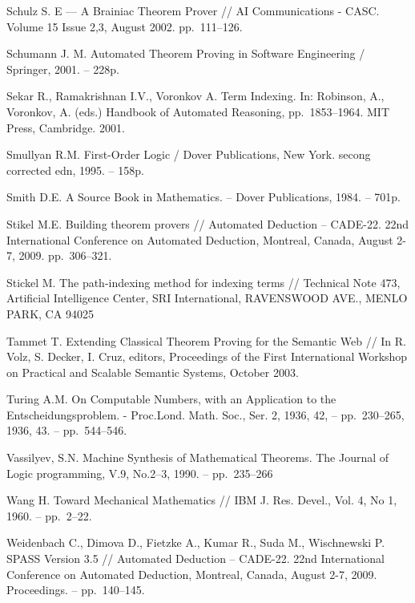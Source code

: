 \begin{thebibliography}{99}
 Schulz S. E --- A Brainiac Theorem Prover // AI Communications - CASC. Volume 15 Issue 2,3, August 2002. pp.~111--126.

 Schumann J. M. Automated Theorem Proving in Software Engineering / Springer, 2001. -- 228p.

 Sekar R., Ramakrishnan I.V., Voronkov A. Term Indexing. In: Robinson, A., Voronkov, A. (eds.) Handbook of Automated Reasoning, pp.~1853--1964. MIT Press, Cambridge. 2001.

 Smullyan R.M. First-Order Logic / Dover Publications, New York. secong corrected edn, 1995. -- 158p.

 Smith D.E. A Source Book in Mathematics. -- Dover Publications, 1984. -- 701p.


 Stikel M.E. Building theorem provers // Automated Deduction – CADE-22. 22nd International Conference on Automated Deduction, Montreal, Canada, August 2-7, 2009. pp.~306--321.

 Stickel M. The path-indexing method for indexing terms // Technical Note 473, Artificial Intelligence Center, SRI International, RAVENSWOOD AVE., MENLO PARK, CA 94025

 Tammet T. Extending Classical Theorem Proving for the Semantic Web // In R. Volz, S. Decker, I. Cruz, editors, Proceedings of the First International Workshop on Practical and Scalable Semantic Systems, October 2003.

 Turing A.M. On Computable Numbers, with an Application to the Entscheidungsproblem. - Proc.Lond. Math. Soc., Ser. 2, 1936, 42, -- pp.~230--265, 1936, 43. -- pp.~544--546.

 Vassilyev, S.N. Machine Synthesis of Mathematical Theorems. The Journal of Logic programming, V.9, No.2--3, 1990. -- pp.~235--266

 Wang H. Toward Mechanical Mathematics // IBM J. Res. Devel., Vol. 4, No 1, 1960. -- pp.~2--22.

 Weidenbach C., Dimova D., Fietzke A., Kumar R., Suda M., Wischnewski P. SPASS Version 3.5 // Automated Deduction – CADE-22. 22nd International Conference on Automated Deduction, Montreal, Canada, August 2-7, 2009. Proceedings. -- pp.~140--145.


\end{thebibliography}
